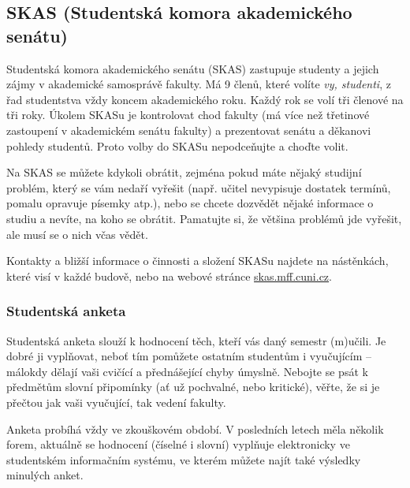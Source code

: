 \subsection[Studentská komora AS]{SKAS (Studentská komora akademického senátu)}
Studentská komora akademického senátu (SKAS) zastupuje studenty a jejich zájmy v
akademické samosprávě fakulty. Má 9 členů, které volíte \textit{vy, studenti}, z
řad studentstva vždy koncem akademického roku. Každý rok se volí tři členové na tři
roky. Úkolem SKASu je kontrolovat chod fakulty (má více než třetinové zastoupení
v akademickém senátu fakulty) a prezentovat senátu a děkanovi
pohledy studentů. Proto volby do SKASu nepodceňujte a choďte volit.

Na SKAS se můžete kdykoli obrátit, zejména pokud máte nějaký studijní problém,
který se vám nedaří vyřešit (např. učitel nevypisuje dostatek termínů, pomalu
opravuje písemky atp.), nebo se chcete dozvědět nějaké informace o studiu a
nevíte, na koho se obrátit. Pamatujte si, že většina problémů jde vyřešit, ale
musí se o nich včas vědět.

Kontakty a bližší informace o činnosti a složení SKASu najdete na nástěnkách, které visí v každé budově, nebo na webové stránce \url{skas.mff.cuni.cz}.

\subsubsection{Studentská anketa}
Studentská anketa slouží k hodnocení těch, kteří vás daný semestr (m)učili. Je
dobré ji vyplňovat, neboť tím pomůžete ostatním studentům i vyučujícím – málokdy
dělají vaši cvičící a přednášející chyby úmyslně. Nebojte se psát k předmětům
slovní připomínky (ať už pochvalné, nebo kritické), věřte, že si je přečtou jak
vaši vyučující, tak vedení fakulty.

Anketa probíhá vždy ve zkouškovém období. V posledních letech měla několik
forem, aktuálně se hodnocení (číselné i slovní) vyplňuje elektronicky ve
studentském informačním systému, ve kterém můžete najít také výsledky
minulých anket.